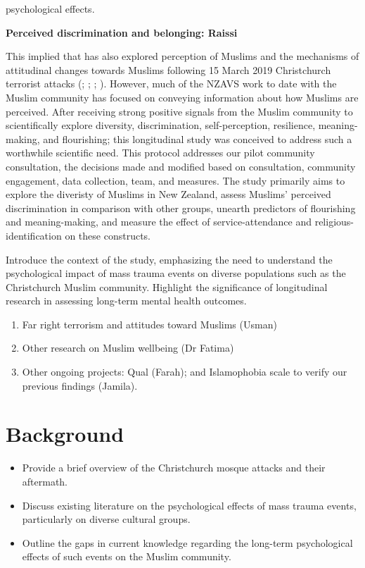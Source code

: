 \documentclass[
  man,
  longtable,
  nolmodern,
  notxfonts,
  notimes,
  colorlinks=true,linkcolor=blue,citecolor=blue,urlcolor=blue]{apa7}
\providecommand{\tightlist}{%
  \setlength{\itemsep}{0pt}\setlength{\parskip}{0pt}}
\begin{document}
psychological effects.

\textbf{Perceived discrimination and belonging: Raissi}

This implied that has also explored perception of Muslims and the
mechanisms of attitudinal changes towards Muslims following 15 March
2019 Christchurch terrorist attacks (; ;
;
). However, much
of the NZAVS work to date with the Muslim community has focused on
conveying information about how Muslims are perceived. After receiving
strong positive signals from the Muslim community to scientifically
explore diversity, discrimination, self-perception, resilience,
meaning-making, and flourishing; this longitudinal study was conceived
to address such a worthwhile scientific need. This protocol addresses
our pilot community consultation, the decisions made and modified based
on consultation, community engagement, data collection, team, and
measures. The study primarily aims to explore the diveristy of Muslims
in New Zealand, assess Muslims' perceived discrimination in comparison
with other groups, unearth predictors of flourishing and meaning-making,
and measure the effect of service-attendance and
religious-identification on these constructs.

Introduce the context of the study, emphasizing the need to understand
the psychological impact of mass trauma events on diverse populations
such as the Christchurch Muslim community. Highlight the significance of
longitudinal research in assessing long-term mental health outcomes.

\begin{enumerate}
\def\labelenumi{\arabic{enumi}.}
\tightlist
\item
  Far right terrorism and attitudes toward Muslims (Usman)
\item
  Other research on Muslim wellbeing (Dr Fatima)
\item
  Other ongoing projects: Qual (Farah); and Islamophobia scale to verify
  our previous findings (Jamila).
\end{enumerate}

\section{Background}\label{background}

\begin{itemize}
\tightlist
\item
  Provide a brief overview of the Christchurch mosque attacks and their
  aftermath.
\item
  Discuss existing literature on the psychological effects of mass
  trauma events, particularly on diverse cultural groups.
\item
  Outline the gaps in current knowledge regarding the long-term
  psychological effects of such events on the Muslim community.
\end{itemize}
\end{document}
